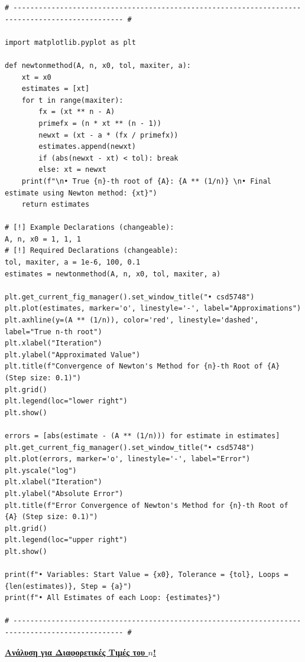 \documentclass[a4paper]{article}
\begin{document}
\vspace{0.75cm}
\begin{verbatim}
# ------------------------------------------------------------------------------------------------ #

import matplotlib.pyplot as plt

def newtonmethod(A, n, x0, tol, maxiter, a):
    xt = x0
    estimates = [xt]
    for t in range(maxiter):
        fx = (xt ** n - A)
        primefx = (n * xt ** (n - 1))
        newxt = (xt - a * (fx / primefx))
        estimates.append(newxt)
        if (abs(newxt - xt) < tol): break
        else: xt = newxt
    print(f"\n• True {n}-th root of {A}: {A ** (1/n)} \n• Final estimate using Newton method: {xt}")
    return estimates

# [!] Example Declarations (changeable):
A, n, x0 = 1, 1, 1
# [!] Required Declarations (changeable):
tol, maxiter, a = 1e-6, 100, 0.1
estimates = newtonmethod(A, n, x0, tol, maxiter, a)

plt.get_current_fig_manager().set_window_title("• csd5748")
plt.plot(estimates, marker='o', linestyle='-', label="Approximations")
plt.axhline(y=(A ** (1/n)), color='red', linestyle='dashed', label="True n-th root")
plt.xlabel("Iteration")
plt.ylabel("Approximated Value")
plt.title(f"Convergence of Newton's Method for {n}-th Root of {A} (Step size: 0.1)")
plt.grid()
plt.legend(loc="lower right")
plt.show()

errors = [abs(estimate - (A ** (1/n))) for estimate in estimates]
plt.get_current_fig_manager().set_window_title("• csd5748")
plt.plot(errors, marker='o', linestyle='-', label="Error")
plt.yscale("log")
plt.xlabel("Iteration")
plt.ylabel("Absolute Error")
plt.title(f"Error Convergence of Newton's Method for {n}-th Root of {A} (Step size: 0.1)")
plt.grid()
plt.legend(loc="upper right")
plt.show()

print(f"• Variables: Start Value = {x0}, Tolerance = {tol}, Loops = {len(estimates)}, Step = {a}")
print(f"• All Estimates of each Loop: {estimates}")

# ------------------------------------------------------------------------------------------------ #
\end{verbatim}


\newpage

\vspace{0.12345cm}
\begin{center}
    \underline{\textbf{ Ανάλυση για Διαφορετικές Τιμές του \(n\)!} \hfill}
\end{center}
\end{document}
